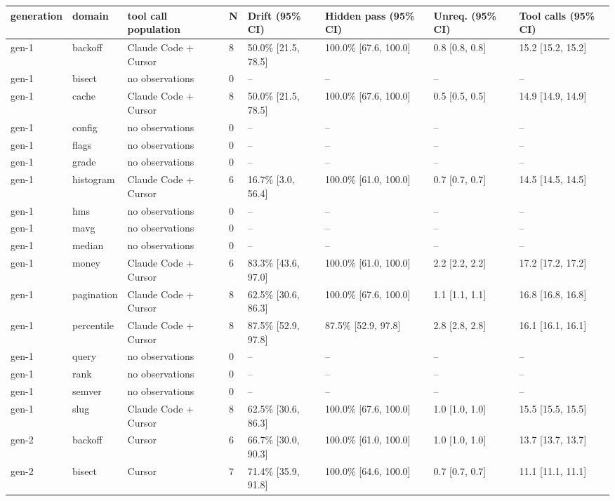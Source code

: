 \begin{tabular}{llllllll}
\toprule
generation & domain & tool call population & N & Drift (95\% CI) & Hidden pass (95\% CI) & Unreq. (95\% CI) & Tool calls (95\% CI) \\
\midrule
gen-1 & backoff & Claude Code + Cursor & 8 & 50.0\% [21.5, 78.5] & 100.0\% [67.6, 100.0] & 0.8 [0.8, 0.8] & 15.2 [15.2, 15.2] \\
gen-1 & bisect & no observations & 0 & -- & -- & -- & -- \\
gen-1 & cache & Claude Code + Cursor & 8 & 50.0\% [21.5, 78.5] & 100.0\% [67.6, 100.0] & 0.5 [0.5, 0.5] & 14.9 [14.9, 14.9] \\
gen-1 & config & no observations & 0 & -- & -- & -- & -- \\
gen-1 & flags & no observations & 0 & -- & -- & -- & -- \\
gen-1 & grade & no observations & 0 & -- & -- & -- & -- \\
gen-1 & histogram & Claude Code + Cursor & 6 & 16.7\% [3.0, 56.4] & 100.0\% [61.0, 100.0] & 0.7 [0.7, 0.7] & 14.5 [14.5, 14.5] \\
gen-1 & hms & no observations & 0 & -- & -- & -- & -- \\
gen-1 & mavg & no observations & 0 & -- & -- & -- & -- \\
gen-1 & median & no observations & 0 & -- & -- & -- & -- \\
gen-1 & money & Claude Code + Cursor & 6 & 83.3\% [43.6, 97.0] & 100.0\% [61.0, 100.0] & 2.2 [2.2, 2.2] & 17.2 [17.2, 17.2] \\
gen-1 & pagination & Claude Code + Cursor & 8 & 62.5\% [30.6, 86.3] & 100.0\% [67.6, 100.0] & 1.1 [1.1, 1.1] & 16.8 [16.8, 16.8] \\
gen-1 & percentile & Claude Code + Cursor & 8 & 87.5\% [52.9, 97.8] & 87.5\% [52.9, 97.8] & 2.8 [2.8, 2.8] & 16.1 [16.1, 16.1] \\
gen-1 & query & no observations & 0 & -- & -- & -- & -- \\
gen-1 & rank & no observations & 0 & -- & -- & -- & -- \\
gen-1 & semver & no observations & 0 & -- & -- & -- & -- \\
gen-1 & slug & Claude Code + Cursor & 8 & 62.5\% [30.6, 86.3] & 100.0\% [67.6, 100.0] & 1.0 [1.0, 1.0] & 15.5 [15.5, 15.5] \\
gen-2 & backoff & Cursor & 6 & 66.7\% [30.0, 90.3] & 100.0\% [61.0, 100.0] & 1.0 [1.0, 1.0] & 13.7 [13.7, 13.7] \\
gen-2 & bisect & Cursor & 7 & 71.4\% [35.9, 91.8] & 100.0\% [64.6, 100.0] & 0.7 [0.7, 0.7] & 11.1 [11.1, 11.1] \\

\end{tabular}
